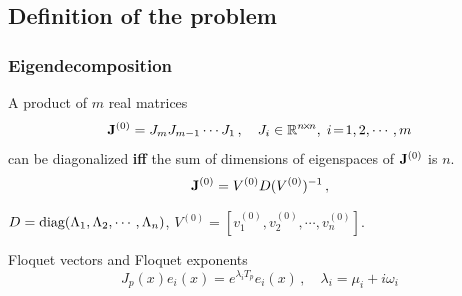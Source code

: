 \documentclass[mathserif, handout]{beamer}
\begin{document}
\subsection{Definition of the problem}

\begin{frame}
  \frametitle{Eigendecomposition}
  A product of $m$ real matrices
  \begin{equation}
    \mathbf{J}^{(0)}=J_{m}J_{m-1}\cdots J_{1}\,,\quad
    J_{i}\in \mathbb{R}^{n\!\times\! n},\; i\!=\!1,2,\cdots,m
    \label{eq:problem}
  \end{equation}
  can be {\color{red} diagonalized}
  \textbf{iff} the sum of dimensions of eigenspaces of
  $\mathbf{J}^{(0)}$ is $n$.
  \begin{equation}
    \label{eq:diagonal}
    \mathbf{J}^{(0)}=V^{(0)}D(V^{(0)})^{-1}
    \,,
  \end{equation}

  \begin{center}
    $D = \text{diag}(\Lambda_{1},\Lambda_{2},\cdots,\Lambda_{n})$,
    $V^{(0)}=[v^{(0)}_{1},v^{(0)}_{2},\cdots,v^{(0)}_{n}]$.
  \end{center}

  \begin{block}{Floquet vectors and Floquet exponents}
    \[
    J_p(x)e_i(x)=e^{\lambda_i T_p}e_i(x)\,,
    \quad \lambda_i = \mu_i + i\omega_i
    \]
  \end{block}



\end{frame}
\end{document}
